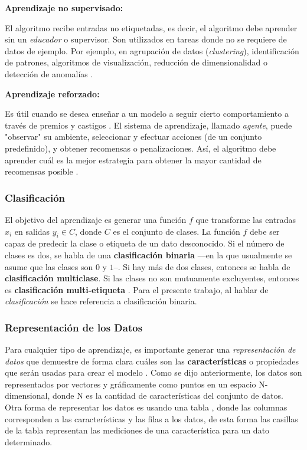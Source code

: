 \textbf{Aprendizaje no supervisado:} 
%

El algoritmo recibe entradas no etiquetadas, es decir, el algoritmo debe aprender sin un \textit{educador} o supervisor. Son utilizados en tareas donde no se requiere de datos de ejemplo. Por ejemplo, en agrupación de datos (\emph{clustering}), identificación de patrones, algoritmos de visualización, reducción de dimensionalidad o detección de anomalías \cite{Bishop}.  
%

\textbf{Aprendizaje reforzado:} 
%

Es útil cuando se desea enseñar a un modelo a seguir cierto comportamiento a través de premios y castigos \cite{Bishop}. El sistema de aprendizaje, llamado \emph{agente}, puede "observar" su ambiente, seleccionar y efectuar acciones (de un conjunto predefinido), y obtener recomensas o penalizaciones. Así, el algoritmo debe aprender cuál es la mejor estrategia para obtener la mayor cantidad de recomensas posible \cite{Geron}. 

\subsubsection{Clasificación}
El objetivo del aprendizaje es generar una función $f$ que transforme las entradas $x_i$ en salidas $y_i \in C$, donde $C$ es el conjunto de clases. La función $f$ debe ser capaz de predecir la clase o etiqueta de un dato desconocido. Si el número de clases es dos, se habla de una \textbf{clasificación binaria} ---en la que usualmente se asume que las clases son $0$ y $1$--. Si hay más de dos clases, entonces se habla de \textbf{clasificación multiclase}. Si las clases no son mutuamente excluyentes, entonces es \textbf{clasificación multi-etiqueta} \cite{Murphy}.
%
Para el presente trabajo, al hablar de \textit{clasificación} se hace referencia a clasificación binaria.

\subsubsection{Representación de los Datos}
Para cualquier tipo de aprendizaje, es importante generar una \textit{representación de datos} que demuestre de forma clara cuáles son las \textbf{características} o propiedades que serán usadas para crear el modelo \cite{Muller}. Como se dijo anteriormente, los datos son representados por vectores y gráficamente como puntos en un espacio N-dimensional, donde N es la cantidad de características del conjunto de datos. Otra forma de representar los datos es usando una tabla \cite{Fernandes}, donde las columnas corresponden a las características y las filas a los datos, de esta forma las casillas de la tabla representan las mediciones de una característica para un dato determinado.
%

